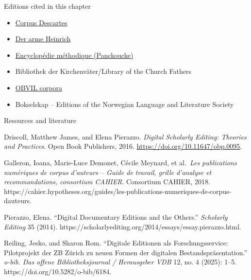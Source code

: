 \documentclass[
  letterpaper,
  DIV=11,
  numbers=noendperiod]{scrreprt}
\providecommand{\tightlist}{%
  \setlength{\itemsep}{0pt}\setlength{\parskip}{0pt}}\usepackage{longtable,booktabs,array}
\begin{document}
Editions cited in this chapter

\begin{itemize}
\item
  \href{https://www.unicaen.fr/puc/sources/prodescartes/}{Corpus
  Descartes}
\item
  \href{https://digi.ub.uni-heidelberg.de/diglit/synopsis/ArmerHeinrich}{Der
  arme Heinrich}
\end{itemize}

\begin{itemize}
\tightlist
\item
  \href{https://encyclopedie.uchicago.edu/encyclop\%C3\%A9die-m\%C3\%A9thodique}{Encyclopédie
  méthodique (Panckoucke)}
\end{itemize}

\begin{itemize}
\tightlist
\item
  Bibliothek der Kirchenväter/Library of the Church Fathers
\end{itemize}

\begin{itemize}
\item
  \href{https://github.com/orgs/OBVIL/repositories}{OBVIL corpora}
\item
  Bokselskap -- Editions of the Norwegian Language and Literature
  Society
\end{itemize}

Resources and literature

Driscoll, Matthew James, and Elena Pierazzo. \emph{Digital Scholarly
Editing: Theories and Practices}. Open Book Publishers, 2016.
\url{https://doi.org/10.11647/obp.0095}.

Galleron, Ioana, Marie-Luce Demonet, Cécile Meynard, et al.~\emph{Les
publications numériques de corpus d'auteurs -- Guide de travail, grille
d'analyse et recommandations, consortium CAHIER}. Consortium CAHIER,
2018.
https://cahier.hypotheses.org/guides/les-publications-numeriques-de-corpus-dauteurs.

Pierazzo, Elena. ``Digital Documentary Editions and the Others.''
\emph{Scholarly Editing} 35 (2014).
https://scholarlyediting.org/2014/essays/essay.pierazzo.html.

Reiling, Jesko, and Sharon Rom. ``Digitale Editionen als
Forschungsservice: Pilotprojekt der ZB Zürich zu neuen Formen der
digitalen Bestandspräsentation.'' \emph{o-bib. Das offene
Bibliotheksjournal / Herausgeber VDB} 12, no. 4 (2025): 1--5.
https://doi.org/10.5282/o-bib/6184.
\end{document}
